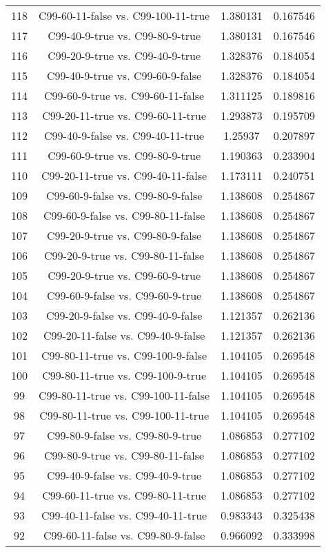 \documentclass[a4paper,10pt]{article}
\begin{document}
\begin{landscape}
\begin{table}[!htp]
\begin{tabular}{cccc}
118&C99-60-11-false vs. C99-100-11-true&1.380131&0.167546\\
117&C99-40-9-true vs. C99-80-9-true&1.380131&0.167546\\
116&C99-20-9-true vs. C99-40-9-true&1.328376&0.184054\\
115&C99-40-9-true vs. C99-60-9-false&1.328376&0.184054\\
114&C99-60-9-true vs. C99-60-11-false&1.311125&0.189816\\
113&C99-20-11-true vs. C99-60-11-true&1.293873&0.195709\\
112&C99-40-9-false vs. C99-40-11-true&1.25937&0.207897\\
111&C99-60-9-true vs. C99-80-9-true&1.190363&0.233904\\
110&C99-20-11-true vs. C99-40-11-false&1.173111&0.240751\\
109&C99-60-9-false vs. C99-80-9-false&1.138608&0.254867\\
108&C99-60-9-false vs. C99-80-11-false&1.138608&0.254867\\
107&C99-20-9-true vs. C99-80-9-false&1.138608&0.254867\\
106&C99-20-9-true vs. C99-80-11-false&1.138608&0.254867\\
105&C99-20-9-true vs. C99-60-9-true&1.138608&0.254867\\
104&C99-60-9-false vs. C99-60-9-true&1.138608&0.254867\\
103&C99-20-9-false vs. C99-40-9-false&1.121357&0.262136\\
102&C99-20-11-false vs. C99-40-9-false&1.121357&0.262136\\
101&C99-80-11-true vs. C99-100-9-false&1.104105&0.269548\\
100&C99-80-11-true vs. C99-100-9-true&1.104105&0.269548\\
99&C99-80-11-true vs. C99-100-11-false&1.104105&0.269548\\
98&C99-80-11-true vs. C99-100-11-true&1.104105&0.269548\\
97&C99-80-9-false vs. C99-80-9-true&1.086853&0.277102\\
96&C99-80-9-true vs. C99-80-11-false&1.086853&0.277102\\
95&C99-40-9-false vs. C99-40-9-true&1.086853&0.277102\\
94&C99-60-11-true vs. C99-80-11-true&1.086853&0.277102\\
93&C99-40-11-false vs. C99-40-11-true&0.983343&0.325438\\
92&C99-60-11-false vs. C99-80-9-false&0.966092&0.333998\\

\end{tabular}
\end{table}
\end{landscape}
\end{document}
